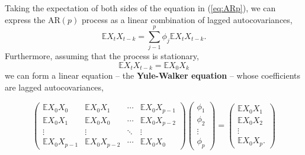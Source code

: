 \documentclass[12pt, twoside, draft]{article}
\begin{document}
Taking the expectation of both sides of the equation in (\ref{eq:ARp}), we can express the AR$(p)$ process as a linear combination of lagged autocovariances,
\begin{equation}
\mathbb{E} X_t X_{t-k} = \sum_{j-1}^p \phi_j \mathbb{E} X_t X_{t-k} .
\end{equation}
Furthermore, assuming that the process is stationary, 
\begin{equation}
\mathbb{E} X_t X_{t-k} = \mathbb{E} X_0 X_k
\end{equation}
we can form a linear equation -- the  \textbf{Yule-Walker equation} -- whose coefficients are lagged autocovariances,

\begin{equation}\label{eq:Yule_Walker}
\begin{pmatrix}
\mathbb{E} X_0 X_0 & \mathbb{E} X_0 X_1 & \cdots & \mathbb{E} X_0 X_{p-1} \\
\mathbb{E} X_0 X_1 & \mathbb{E} X_0 X_0 & \cdots & \mathbb{E} X_0 X_{p-2} \\
\vdots & \vdots & \ddots & \vdots \\
\mathbb{E} X_0 X_{p-1} & \mathbb{E} X_0 X_{p-2} & \cdots & \mathbb{E} X_0 X_0
\end{pmatrix}
\begin{pmatrix}
\phi_1 \\
\phi_2 \\
\vdots \\
\phi_p
\end{pmatrix} = 
\begin{pmatrix}
\mathbb{E} X_0 X_1 \\
\mathbb{E} X_0 X_2 \\
\vdots \\
\mathbb{E} X_0 X_p.
\end{pmatrix}
\end{equation}
\end{document}
